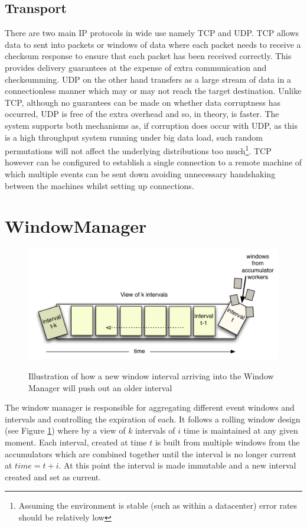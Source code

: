 \documentclass[a4paper,11pt]{scrreprt}
\begin{document}
\subsection{Transport}
There are two main IP protocols in wide use namely TCP and UDP. TCP allows data to sent into packets or windows of data where each packet needs to receive a checksum response to ensure that each packet has been received correctly. This provides delivery guarantees at the expense of extra communication and checksumming. UDP on the other hand transfers as a large stream of data in a connectionless manner which may or may not reach the target destination. Unlike TCP, although no guarantees can be made on whether data corruptness has occurred, UDP is free of the extra overhead and so, in theory, is faster. The system supports both mechanisms as, if corruption does occur with UDP, as this is a high throughput system running under big data load, such random permutations will not affect the underlying distributions too much\footnote{Assuming the environment is stable (such as within a datacenter) error rates should be relatively low}. TCP however can be configured to establish a single connection to a remote machine of which multiple events can be sent down avoiding unnecessary handshaking between the machines whilst setting up connections.
\section{WindowManager}
\begin{figure}[h!]
\centering
\caption{Illustration of how a new window interval arriving into the Window Manager will push out an older interval}
\includegraphics[scale=0.72, trim=0 0 0 12, clip=true] {window.pdf}
\label{fig:rollingwindow}
\end{figure}
The window manager is responsible for aggregating different event windows and intervals and controlling the expiration of each. It follows a rolling window design (see Figure \ref{fig:rollingwindow}) where by a view of \(k\) intervals of \(i\) time is maintained at any given moment. Each interval, created at time \(t\) is built from multiple windows from the accumulators which are combined together until the interval is no longer current at \(time = t+i\). At this point the interval is made immutable and a new interval created and set as current. 
\end{document}
